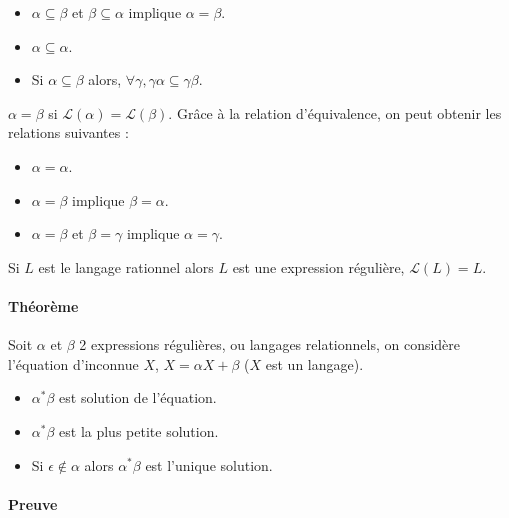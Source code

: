 \begin{itemize}
	\item $\alpha \subseteq \beta$ et $\beta \subseteq \alpha$ implique $\alpha = \beta$.
	\item $\alpha \subseteq \alpha$.
	\item Si $\alpha \subseteq \beta$ alors, $\forall \gamma, \gamma\alpha \subseteq \gamma\beta$.
\end{itemize}


$\alpha = \beta$ si $\mathcal{L}(\alpha)=\mathcal{L}(\beta)$. Grâce à la relation d'équivalence, on peut obtenir les relations suivantes :


\begin{itemize}
	\item $\alpha = \alpha$.
	\item $\alpha = \beta$ implique $\beta = \alpha$.
	\item $\alpha = \beta$ et $\beta = \gamma$ implique $\alpha = \gamma$.
\end{itemize}


Si $L$ est le langage rationnel alors $L$ est une expression régulière, $\mathcal{L}(L)=L$.


\paragraph{Théorème} %
\label{par:th_or_me}

Soit $\alpha$ et $\beta$ 2 expressions régulières, ou langages relationnels, on considère l'équation d'inconnue $X$, $X = \alpha X + \beta$ ($X$ est un langage).


\begin{itemize}
	\item $\alpha^* \beta$ est solution de l'équation.
	\item $\alpha^* \beta$ est la plus petite solution.
	\item Si $\epsilon \not \in \alpha$ alors $\alpha^* \beta$ est l'unique solution.
\end{itemize}



\paragraph{Preuve} %
\label{par:preuve}

